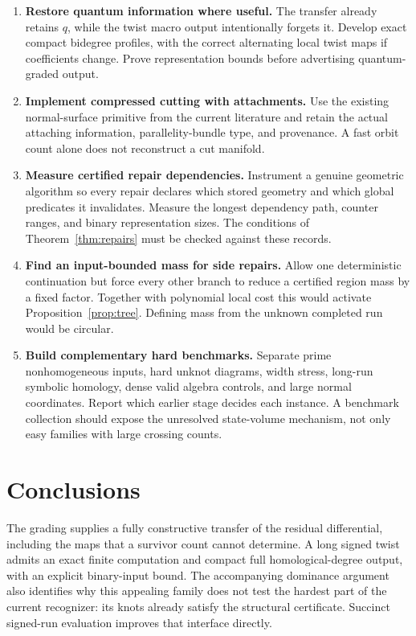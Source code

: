 \documentclass[11pt]{article}
\theoremstyle{definition}
\theoremstyle{remark}
\begin{document}
\begin{enumerate}[label=\textbf{\arabic*.},itemsep=6pt]
\item \textbf{Restore quantum information where useful.} The transfer already retains $q$, while the twist macro output intentionally forgets it. Develop exact compact bidegree profiles, with the correct alternating local twist maps if coefficients change. Prove representation bounds before advertising quantum-graded output.
\item \textbf{Implement compressed cutting with attachments.} Use the existing normal-surface primitive from the current literature and retain the actual attaching information, parallelity-bundle type, and provenance. A fast orbit count alone does not reconstruct a cut manifold.
\item \textbf{Measure certified repair dependencies.} Instrument a genuine geometric algorithm so every repair declares which stored geometry and which global predicates it invalidates. Measure the longest dependency path, counter ranges, and binary representation sizes. The conditions of Theorem~\ref{thm:repairs} must be checked against these records.
\item \textbf{Find an input-bounded mass for side repairs.} Allow one deterministic continuation but force every other branch to reduce a certified region mass by a fixed factor. Together with polynomial local cost this would activate Proposition~\ref{prop:tree}. Defining mass from the unknown completed run would be circular.
\item \textbf{Build complementary hard benchmarks.} Separate prime nonhomogeneous inputs, hard unknot diagrams, width stress, long-run symbolic homology, dense valid algebra controls, and large normal coordinates. Report which earlier stage decides each instance. A benchmark collection should expose the unresolved state-volume mechanism, not only easy families with large crossing counts.
\end{enumerate}

\section{Conclusions}
The grading supplies a fully constructive transfer of the residual differential, including the maps that a survivor count cannot determine. A long signed twist admits an exact finite computation and compact full homological-degree output, with an explicit binary-input bound. The accompanying dominance argument also identifies why this appealing family does not test the hardest part of the current recognizer: its knots already satisfy the structural certificate. Succinct signed-run evaluation improves that interface directly.
\end{document}
